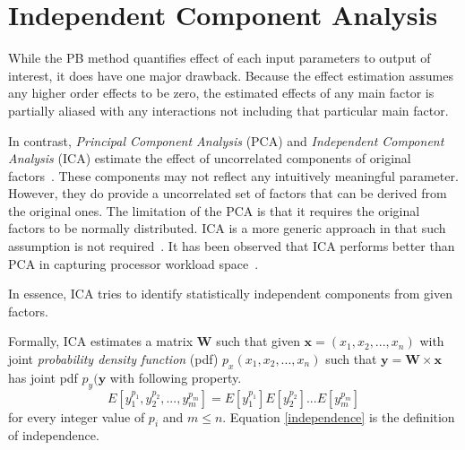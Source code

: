 \section{Independent Component Analysis}
\label{BG_ICA}
While the PB method quantifies effect of each input parameters to output of interest, it does have one major drawback. 
Because the effect estimation assumes any higher order effects to be zero, the estimated effects of any main factor is partially aliased with any interactions not including that particular main factor. 

In contrast, \emph{Principal Component Analysis} (PCA) and \emph{Independent Component Analysis} (ICA) estimate the effect of uncorrelated components of original factors~\cite{stone:2002}. 
These components may not reflect any intuitively meaningful parameter. 
However, they do provide a uncorrelated set of factors that can be derived from the original ones. 
The limitation of the PCA is that it requires the original factors to be normally distributed. 
ICA is a more generic approach in that such assumption is not required~\cite{christopoulos:2008}. 
It has been observed that ICA performs better than PCA in capturing processor workload space~\cite{eeckhout:2005}. 

In essence, ICA tries to identify statistically independent components from given factors. 

Formally, ICA estimates a matrix $\mathbf{W}$ such that given $\mathbf{x}=(x_1, x_2, ..., x_n)$ with joint \emph{probability density function} (pdf) $p_x(x_1, x_2, ..., x_n)$ such that $\mathbf{y}=\mathbf{W} \times \mathbf{x}$ has joint pdf $p_y(\mathbf{y}$ with following property.
\begin{equation}\label{independence}
E[y_1^{p_1}, y_2^{p_2}, ..., y_m^{p_m}]=E[y_1^{p_1}]E[y_2^{p_2}]...E[y_m^{p_m}]
\end{equation}
for every integer value of $p_i$ and $m \le n$. Equation \ref{independence} is the definition of independence.
